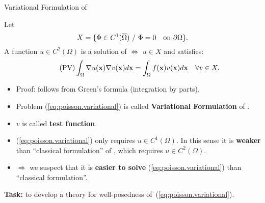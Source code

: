 \begin{frame}{Variational Formulation of \poissonProblem}
  \small
  \begin{proposition}
  Let
  $$
  X=\{ \Phi\in C^1(\overline\Omega) \ / \  \Phi=0 \quad \mbox{on } \partial\Omega\}.
  $$
  A function $u\in C^2(\Omega)$ is a solution of \poissonProblem $\mathbf\Longleftrightarrow$ $u\in X$ and satisfies:
  \begin{equation}
    \tag{PV}
    \int_\Omega \nabla u(\mathbf{x}) \nabla v(\mathbf{x}) d\mathbf{x} = \int_\Omega f(\mathbf{x}) v(\mathbf{x}) d\mathbf{x} \quad \forall v\in X.
    \label{eq:poisson.variational}
  \end{equation}
  \end{proposition}
  \begin{itemize}
  \item Proof: follows from Green's formula (integration by parts).
  \item Problem (\ref{eq:poisson.variational}) is called
    \alert{\textbf{Variational Formulation}} of \poissonProblem.
  \item $v$ is called \textbf{test function}.
  \item (\ref{eq:poisson.variational}) only requires
    $u\in C^1(\Omega)$. In this sense it is \textbf{weaker} than ``classical
    formulation'' of \poissonProblem, which requires $u\in C^2(\Omega)$.
  \item $\Rightarrow$ we suspect that it is \textbf{easier to solve}
    (\ref{eq:poisson.variational}) than ``classical formulation''.
  \end{itemize}
  \begin{center}
    \textbf{Task:} to develop a theory for well-posedness
    of~(\ref{eq:poisson.variational}).
  \end{center}
\end{frame}

